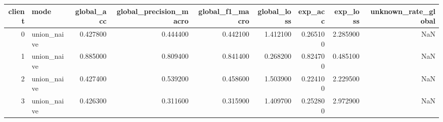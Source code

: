 \begin{tabular}{rlrrrrrrr}
\toprule
client & mode & global_acc & global_precision_macro & global_f1_macro & global_loss & exp_acc & exp_loss & unknown_rate_global \\
\midrule
0 & union_naive & 0.427800 & 0.444400 & 0.442100 & 1.412100 & 0.265100 & 2.285900 & NaN \\
1 & union_naive & 0.885000 & 0.809400 & 0.841400 & 0.268200 & 0.824700 & 0.485100 & NaN \\
2 & union_naive & 0.427400 & 0.539200 & 0.458600 & 1.503900 & 0.224100 & 2.229500 & NaN \\
3 & union_naive & 0.426300 & 0.311600 & 0.315900 & 1.409700 & 0.252800 & 2.972900 & NaN \\
\bottomrule
\end{tabular}
